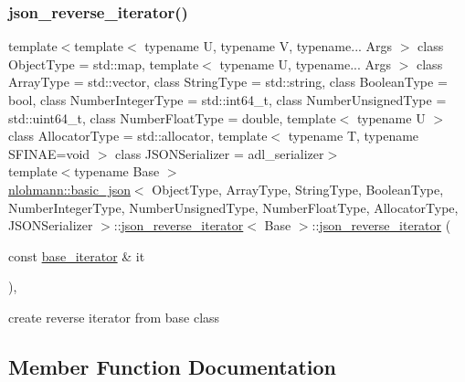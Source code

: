 \subsubsection{\texorpdfstring{json\+\_\+reverse\+\_\+iterator()}{json\_reverse\_iterator()}\hspace{0.1cm}{\footnotesize\ttfamily [2/2]}}
{\footnotesize\ttfamily template$<$template$<$ typename U, typename V, typename... Args $>$ class Object\+Type = std\+::map, template$<$ typename U, typename... Args $>$ class Array\+Type = std\+::vector, class String\+Type  = std\+::string, class Boolean\+Type  = bool, class Number\+Integer\+Type  = std\+::int64\+\_\+t, class Number\+Unsigned\+Type  = std\+::uint64\+\_\+t, class Number\+Float\+Type  = double, template$<$ typename U $>$ class Allocator\+Type = std\+::allocator, template$<$ typename T, typename S\+F\+I\+N\+A\+E=void $>$ class J\+S\+O\+N\+Serializer = adl\+\_\+serializer$>$ \\
template$<$typename Base $>$ \\
\hyperlink{classnlohmann_1_1basic__json}{nlohmann\+::basic\+\_\+json}$<$ Object\+Type, Array\+Type, String\+Type, Boolean\+Type, Number\+Integer\+Type, Number\+Unsigned\+Type, Number\+Float\+Type, Allocator\+Type, J\+S\+O\+N\+Serializer $>$\+::\hyperlink{classnlohmann_1_1basic__json_1_1json__reverse__iterator}{json\+\_\+reverse\+\_\+iterator}$<$ Base $>$\+::\hyperlink{classnlohmann_1_1basic__json_1_1json__reverse__iterator}{json\+\_\+reverse\+\_\+iterator} (\begin{DoxyParamCaption}\item[{const \hyperlink{classnlohmann_1_1basic__json_1_1json__reverse__iterator_a5b7f3c5d86fe89a65d9552c1cac37261}{base\+\_\+iterator} \&}]{it }\end{DoxyParamCaption})\hspace{0.3cm}{\ttfamily [inline]}, {\ttfamily [noexcept]}}



create reverse iterator from base class 



\subsection{Member Function Documentation}
\mbox{\label{classnlohmann_1_1basic__json_1_1json__reverse__iterator_a26c551e1cee90ee52be00b5165804598}} 
